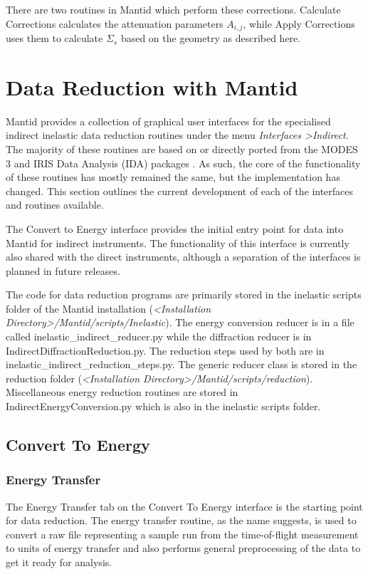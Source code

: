 \documentclass[paper=a4, fontsize=11pt]{scrartcl}	%
\numberwithin{equation}{section}															%
\numberwithin{figure}{section}																%
\numberwithin{table}{section}																%
\begin{document}
There are two routines in Mantid which perform these corrections. Calculate Corrections calculates the attenuation parameters $A_{i,j}$, while Apply Corrections uses them to calculate $\Sigma_s$ based on the geometry as described here.

\clearpage
\section{Data Reduction with Mantid}
Mantid provides a collection of graphical user interfaces for the specialised indirect inelastic data reduction routines under the menu \textit{Interfaces \textgreater Indirect}. The majority of these routines are based on or directly ported from the MODES 3 and IRIS Data Analysis (IDA) packages \citep{wshowells2010, wshowells1996}. As such, the core of the functionality of these routines has mostly remained the same, but the implementation has changed. This section outlines the current development of each of the interfaces and routines available.

The Convert to Energy interface provides the initial entry point for data into Mantid for indirect instruments. The functionality of this interface is currently also shared with the direct instruments, although a separation of the interfaces is planned in future releases.

The code for data  reduction programs are primarily stored in the inelastic scripts folder of the Mantid installation (\textit{\textless Installation Directory\textgreater /Mantid/scripts/Inelastic}). The energy conversion reducer is in a file called inelastic\_indirect\_reducer.py while the diffraction reducer is in IndirectDiffractionReduction.py. The reduction steps used by both are in inelastic\_indirect\_reduction\_steps.py. The generic reducer class is stored in the reduction folder (\textit{\textless Installation Directory\textgreater/Mantid/scripts/reduction}). Miscellaneous energy reduction routines are stored in IndirectEnergyConversion.py which is also in the inelastic scripts folder.

\subsection{Convert To Energy}
\subsubsection{Energy Transfer}
\label{sec:energy-transfer}
The Energy Transfer tab on the Convert To Energy interface is the starting point for data reduction. The energy transfer routine, as the name suggests, is used to convert a raw file representing a sample run from the time-of-flight measurement to units of energy transfer and also performs general preprocessing of the data to get it ready for analysis.
\end{document}

